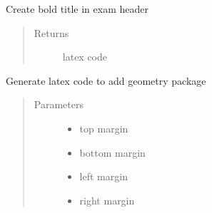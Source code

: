 \documentclass[letterpaper,10pt,english]{sphinxmanual}
\begin{document}
\begin{fulllineitems}
\label{\detokenize{index:pytexexam.latexexamutil.bold_title}}
\sphinxAtStartPar
Create bold title in exam header
\begin{quote}\begin{description}
\item[{Returns}] \leavevmode
\sphinxAtStartPar
latex code

\end{description}\end{quote}

\end{fulllineitems}


\begin{fulllineitems}
\label{\detokenize{index:pytexexam.latexexamutil.geometry_package}}
\sphinxAtStartPar
Generate latex code to add geometry package
\begin{quote}\begin{description}
\item[{Parameters}] \leavevmode\begin{itemize}
\item {} 
\sphinxAtStartPar
{} \textendash{} top margin

\item {} 
\sphinxAtStartPar
{} \textendash{} bottom margin

\item {} 
\sphinxAtStartPar
{} \textendash{} left margin

\item {} 
\sphinxAtStartPar
{} \textendash{} right margin

\end{itemize}

\end{description}\end{quote}

\end{fulllineitems}
\end{document}
